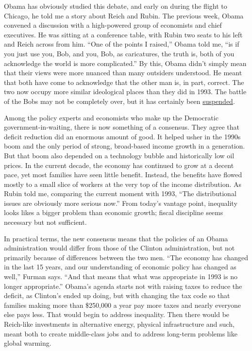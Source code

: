 Obama has obviously studied this debate, and early on during the flight
to Chicago, he told me a story about Reich and Rubin. The previous week,
Obama convened a discussion with a high-powered group of economists and
chief executives. He was sitting at a conference table, with Rubin two
seats to his left and Reich across from him. ``One of the points I
raised,'' Obama told me, ``is if you just use you, Bob, and you, Bob, as
caricatures, the truth is, both of you acknowledge the world is more
complicated.'' By this, Obama didn't simply mean that their views were
more nuanced than many outsiders understood. He meant that both have
come to acknowledge that the other man is, in part, correct. The two now
occupy more similar ideological places than they did in 1993. The battle
of the Bobs may not be completely over, but it has certainly been
\href{http://www.nytimes3xbfgragh.onion/2007/06/10/magazine/10wwln-summers-t.html}{suspended}.

Among the policy experts and economists who make up the Democratic
government-in-waiting, there is now something of a consensus. They agree
that deficit reduction did an enormous amount of good. It helped usher
in the 1990s boom and the only period of strong, broad-based income
growth in a generation. But that boom also depended on a technology
bubble and historically low oil prices. In the current decade, the
economy has continued to grow at a decent pace, yet most families have
seen little benefit. Instead, the benefits have flowed mostly to a small
slice of workers at the very top of the income distribution. As Rubin
told me, comparing the current moment with 1993, ``The distributional
issues are obviously more serious now.'' From today's vantage point,
inequality looks likes a bigger problem than economic growth; fiscal
discipline seems necessary but not sufficient.

In practical terms, the new consensus means that the policies of an
Obama administration would differ from those of the Clinton
administration, but not primarily because of differences between the two
men. ``The economy has changed in the last 15 years, and our
understanding of economic policy has changed as well,'' Furman says.
``And that means that what was appropriate in 1993 is no longer
appropriate.'' Obama's agenda starts not with raising taxes to reduce
the deficit, as Clinton's ended up doing, but with changing the tax code
so that families making more than \$250,000 a year pay more taxes and
nearly everyone else pays less. That would begin to address inequality.
Then there would be Reich-like investments in alternative energy,
physical infrastructure and such, meant both to create middle-class jobs
and to address long-term problems like global warming.

